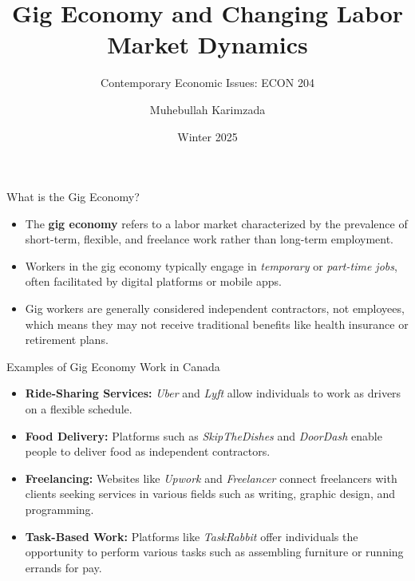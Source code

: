 \documentclass{beamer}
\title{Gig Economy and Changing Labor Market Dynamics}
\subtitle{Contemporary Economic Issues: ECON 204}
\author{Muhebullah Karimzada}
\date{Winter 2025}
\begin{document}
\begin{frame}
    \titlepage
\end{frame}


\begin{frame}{What is the Gig Economy?}
    \begin{itemize}
        \item The \textbf{gig economy} refers to a labor market characterized by the prevalence of short-term, flexible, and freelance work rather than long-term employment.
        \item Workers in the gig economy typically engage in \textit{temporary} or \textit{part-time jobs}, often facilitated by digital platforms or mobile apps.
        \item Gig workers are generally considered independent contractors, not employees, which means they may not receive traditional benefits like health insurance or retirement plans.
    \end{itemize}
\end{frame}

\begin{frame}{Examples of Gig Economy Work in Canada}
    \begin{itemize}
        \item \textbf{Ride-Sharing Services:} \textit{Uber} and \textit{Lyft} allow individuals to work as drivers on a flexible schedule.
        \item \textbf{Food Delivery:} Platforms such as \textit{SkipTheDishes} and \textit{DoorDash} enable people to deliver food as independent contractors.
        \item \textbf{Freelancing:} Websites like \textit{Upwork} and \textit{Freelancer} connect freelancers with clients seeking services in various fields such as writing, graphic design, and programming.
        \item \textbf{Task-Based Work:} Platforms like \textit{TaskRabbit} offer individuals the opportunity to perform various tasks such as assembling furniture or running errands for pay.
    \end{itemize}
\end{frame}
\end{document}
